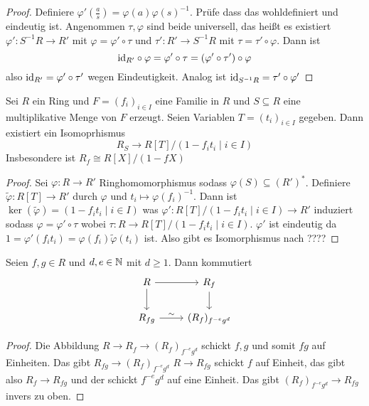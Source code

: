 \begin{proof}
    Definiere $\varphi'(\frac a s)=\varphi(a)\varphi(s)^{-1}$. Prüfe dass das wohldefiniert und eindeutig ist. 
    Angenommen $\tau,\varphi$ sind beide universell, das heißt es existiert $\varphi'\colon S^{-1}R\to R'$ mit $\varphi=\varphi'\circ\tau$ und $\tau'\colon R'\to S^{-1}R$ mit $\tau=\tau'\circ \varphi$.
    Dann ist 
    $$\mathrm{id}_{R'}\circ \varphi=\varphi'\circ \tau=(\varphi'\circ \tau')\circ \varphi$$ also $\mathrm{id}_{R'}=\varphi'\circ\tau'$ wegen Eindeutigkeit. Analog ist $\mathrm{id}_{S^{-1}R}=\tau'\circ\varphi'$
\end{proof}
\begin{Lemma}
    Sei $R$ ein Ring und $F=(f_i)_{i\in I}$ eine Familie in $R$ und $S\subseteq R$ eine multiplikative Menge von $F$ erzeugt. Seien Variablen $T=(t_i)_{i\in I}$ gegeben.
    Dann existiert ein Isomoprhismus 
    $$R_S\to R[T]/(1-f_it_i\mid i\in I)$$
    Insbesondere ist $R_f\cong R[X]/(1-fX)$
\end{Lemma}
\begin{proof}
    Sei $\varphi:R\to R'$ Ringhomomorphismus sodass $\varphi(S)\subseteq (R')^*$. Definiere $\tilde\varphi\colon R[T]\to R'$ durch $\varphi$ und $t_i\mapsto \varphi(f_i)^{-1}$.
    Dann ist $\ker(\tilde\varphi)=(1-f_it_i\mid i\in I)$ was $\varphi':R[T]/(1-f_it_i\mid i\in I)\to R'$ induziert sodass $\varphi=\varphi'\circ\tau$ wobei $\tau:R\to R[T]/(1-f_it_i\mid i\in I)$.
    $\varphi'$ ist eindeutig da $1=\varphi'(f_it_i)=\varphi(f_i)\tilde\varphi(t_i)$ ist. Also gibt es Isomorphismus nach ????
\end{proof}
\begin{Satz}
    Seien $f,g\in R$ und $d,e\in\mathbb{N}$ mit $d\geq 1$. Dann kommutiert $$%
\begin{tikzcd}
R \arrow[d] \arrow[r]    & R_f \arrow[d]     \\
R_{fg} \arrow[r, "\sim"] & (R_f)_{f^{-e}g^d}
\end{tikzcd}$$
\end{Satz}
\begin{proof}
    Die Abbildung $R\to R_f\to (R_f)_{f^{-e}g^d}$ schickt $f,g$ und somit $fg$ auf Einheiten. 
    Das gibt $R_{fg}\to (R_f)_{f^{-e}g^d}$
    $R\to R_{fg}$ schickt $f$ auf Einheit, das gibt also $R_f\to R_{fg}$ und der schickt $f^{-e}g^d$ auf eine Einheit. Das gibt $(R_f)_{f^{-e}g^d}\to R_{fg}$ invers zu oben.
\end{proof}
